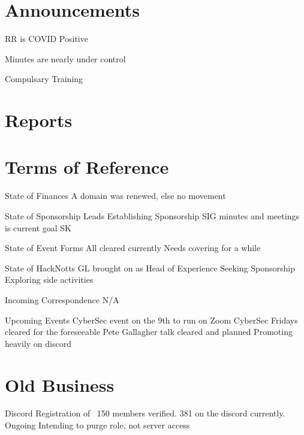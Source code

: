 \documentclass[11pt,hacksoc]{meetingmins}
\begin{document}
\maketitle

\section{Announcements}
\begin{items}
\item RR is COVID Positive
\item Minutes are nearly under control
\item Compulsary Training
\end{items}

\section{Reports}


\section{Terms of Reference}
\begin{items}
\item {State of Finances}
\subitem A domain was renewed, else no movement
\item {State of Sponsorship Leads}
\subitem Establishing Sponsorship SIG minutes and meetings is current goal SK
\item {State of Event Forms}
\subitem All cleared currently
\subitem Needs covering for a while
\item {State of HackNotts}
\subitem GL brought on as Head of Experience
\subitem Seeking Sponsorship
\subitem Exploring side activities
\item {Incoming Correspondence}
\subitem N/A
\item {Upcoming Events}
\subitem CyberSec event on the 9th to run on Zoom
\subitem CyberSec Fridays cleared for the foreseeable
\subitem Pete Gallagher talk cleared and planned
\subitem Promoting heavily on discord
\end{items}

\section{Old Business}
\begin{items}
\item Discord Registration
   of ~150 members verified. 381 on the discord currently.
  \subitem Ongoing
  \subitem Intending to purge role, not server access
\end{items}
\end{document}
